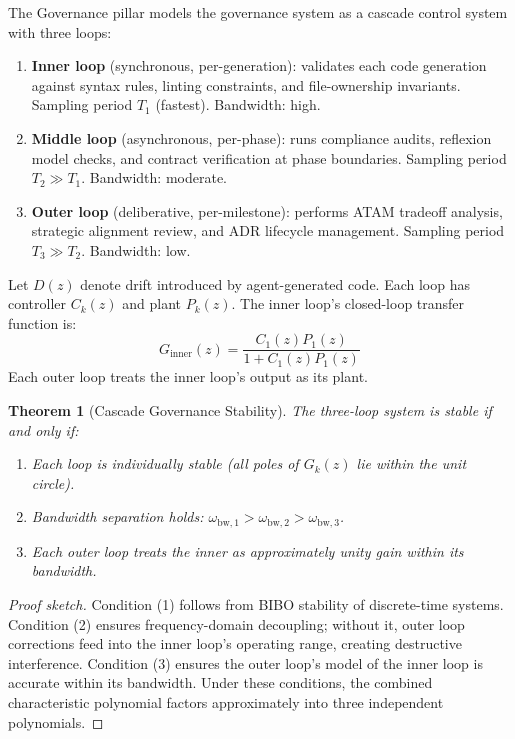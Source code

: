 \documentclass[11pt, a4paper]{googledeepmind}
\newtheorem{theorem}{Theorem}[section]
\begin{document}
The Governance pillar models the governance system as a cascade control system with three loops:

\begin{enumerate}
    \item \textbf{Inner loop} (synchronous, per-generation): validates each code generation against syntax rules, linting constraints, and file-ownership invariants. Sampling period $T_1$ (fastest). Bandwidth: high.
    \item \textbf{Middle loop} (asynchronous, per-phase): runs compliance audits, reflexion model checks, and contract verification at phase boundaries. Sampling period $T_2 \gg T_1$. Bandwidth: moderate.
    \item \textbf{Outer loop} (deliberative, per-milestone): performs ATAM tradeoff analysis, strategic alignment review, and ADR lifecycle management. Sampling period $T_3 \gg T_2$. Bandwidth: low.
\end{enumerate}

Let $D(z)$ denote drift introduced by agent-generated code. Each loop has controller $C_k(z)$ and plant $P_k(z)$. The inner loop's closed-loop transfer function is:
\begin{equation}
    G_{\mathrm{inner}}(z) = \frac{C_1(z) P_1(z)}{1 + C_1(z) P_1(z)}
\end{equation}
Each outer loop treats the inner loop's output as its plant.

\begin{theorem}[Cascade Governance Stability]
\label{thm:cascade-stability}
The three-loop system is stable if and only if:
\begin{enumerate}
    \item Each loop is individually stable (all poles of $G_k(z)$ lie within the unit circle).
    \item Bandwidth separation holds: $\omega_{\mathrm{bw},1} > \omega_{\mathrm{bw},2} > \omega_{\mathrm{bw},3}$.
    \item Each outer loop treats the inner as approximately unity gain within its bandwidth.
\end{enumerate}
\end{theorem}

\begin{proof}[Proof sketch]
Condition (1) follows from BIBO stability of discrete-time systems. Condition (2) ensures frequency-domain decoupling; without it, outer loop corrections feed into the inner loop's operating range, creating destructive interference. Condition (3) ensures the outer loop's model of the inner loop is accurate within its bandwidth. Under these conditions, the combined characteristic polynomial factors approximately into three independent polynomials.
\end{proof}
\end{document}
